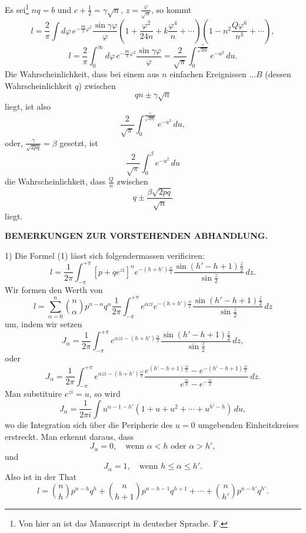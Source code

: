 \documentclass[11pt]{article}
\begin{document}
Es sei\footnote{Von hier an ist das Manuscript in deutscher Sprache. F.} $nq=b$ und $c+\frac12=\gamma\sqrt n$, $z=\frac{\varphi}{\sqrt n}$, so kommt
\begin{equation}
 l=\frac2\pi\int d\varphi\,e^{-\frac{pq}{2}\varphi^2}\frac{\sin\gamma\varphi}{\varphi}\left(1+\frac{\varphi^2}{24n}+k\frac{\varphi^4}{n}+\cdots\right)\left(1-n^2\frac{Q\varphi^6}{n^3}+\cdots\right),
\tag{7}
\end{equation}
\begin{equation}
 l=\frac2\pi\int_0^\infty d\varphi\,e^{-\frac{pq}{2}\varphi^2}\frac{\sin\gamma\varphi}{\varphi}
 =\frac2{\sqrt\pi}\int_0^{\frac{\gamma}{\sqrt{2pq}}}e^{-u^2}\,du.
\tag{8}
\end{equation}
Die Wahrscheinlichkeit, dass bei einem aus $n$ einfachen Ereignissen $\ldots B$ (dessen Wahrscheinlichkeit $q$) zwischen
\[
 qn\pm\gamma\sqrt n
\]
liegt, ist also
\[
 \frac2{\sqrt\pi}\int_0^{\frac{\gamma}{\sqrt{2pq}}}e^{-u^2}\,du,
\]
oder, $\frac{\gamma}{\sqrt{2pq}}=\beta$ gesetzt, ist
\[
 \frac2{\sqrt\pi}\int_0^\beta e^{-u^2}\,du
\]
die Wahrscheinlichkeit, dass $\frac Qn$ zwischen
\[
 q\pm\frac{\beta\sqrt{2pq}}{\sqrt n}
\]
liegt.

\begin{center}\large\bfseries BEMERKUNGEN ZUR VORSTEHENDEN ABHANDLUNG.\end{center}

1) Die Formel (1) lässt sich folgendermassen verificiren:
\[
 l=\frac{1}{2\pi}\int_{-\pi}^{+\pi}[p+qe^{zi}]^n e^{-(h+h')\frac{zi}{2}}\frac{\sin(h'-h+1)\frac z2}{\sin\frac z2}\,dz.
\]
Wir formen den Werth von
\[
 l=\sum_{\alpha=0}^n \binom n\alpha p^{n-\alpha}q^\alpha\frac{1}{2\pi}\int_{-\pi}^{+\pi}e^{\alpha zi}e^{-(h+h')\frac{zi}{2}}\frac{\sin(h'-h+1)\frac z2}{\sin\frac z2}\,dz
\]
um, indem wir setzen
\[
 J_\alpha=\frac{1}{2\pi}\int_{-\pi}^{+\pi}e^{\alpha zi-(h+h')\frac{zi}{2}}\frac{\sin(h'-h+1)\frac z2}{\sin\frac z2}\,dz,
\]
oder
\[
 J_\alpha=\frac{1}{2\pi}\int_{-\pi}^{+\pi}e^{\alpha zi-(h+h')\frac{zi}{2}}\frac{e^{(h'-h+1)\frac{zi}{2}}-e^{-(h'-h+1)\frac{zi}{2}}}{e^{\frac{zi}{2}}-e^{-\frac{zi}{2}}}\,dz.
\]
Man substituire $e^{zi}=u$, so wird
\[
 J_\alpha=\frac{1}{2\pi i}\int u^{\alpha-1-h'}(1+u+u^2+\cdots+u^{h'-h})\,du,
\]
wo die Integration sich über die Peripherie des $u=0$ umgebenden Einheitskreises erstreckt. Man erkennt daraus, dass
\[
 J_\alpha=0,\quad \text{wenn }\alpha<h\text{ oder }\alpha>h',
\]
und
\[
 J_\alpha=1,\quad \text{wenn }h\le\alpha\le h'.
\]
Also ist in der That
\[
 l=\binom nh p^{n-h}q^h+\binom n{h+1}p^{n-h-1}q^{h+1}+\cdots+\binom n{h'}p^{n-h'}q^{h'}.
\]
\end{document}
